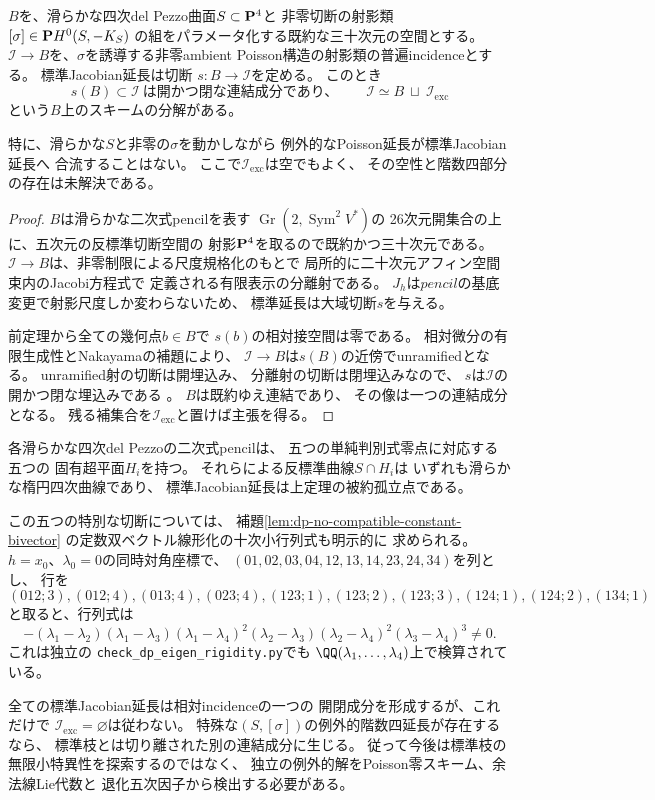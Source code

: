 \begin{theorem}[普遍incidenceにおける標準Jacobian枝の開閉分離]
\label{thm:dp-global-standard-branch-splitting}
$B$を、滑らかな四次del Pezzo曲面$S\subset\mathbf P^4$と
非零切断の射影類$[\sigma]\in\mathbf P H^0(S,-K_S)$
の組をパラメータ化する既約な三十次元の空間とする。
$\mathscr I\to B$を、$\sigma$を誘導する非零ambient
Poisson構造の射影類の普遍incidenceとする。
標準Jacobian延長は切断
$s:B\to\mathscr I$を定める。
このとき
\[
 \boxed{\quad
 s(B)\subset\mathscr I\ \text{は開かつ閉な連結成分であり、}
 \qquad
 \mathscr I\simeq B\ \sqcup\ \mathscr I_{\mathrm{exc}}
 \quad}
\]
という$B$上のスキームの分解がある。

特に、滑らかな$S$と非零の$\sigma$を動かしながら
例外的なPoisson延長が標準Jacobian延長へ
合流することはない。
ここで$\mathscr I_{\mathrm{exc}}$は空でもよく、
その空性と階数四部分の存在は未解決である。
\end{theorem}
\begin{proof}
$B$は滑らかな二次式pencilを表す
$\operatorname{Gr}(2,\operatorname{Sym}^2V^*)$の
26次元開集合の上に、五次元の反標準切断空間の
射影$\mathbf P^4$を取るので既約かつ三十次元である。
$\mathscr I\to B$は、非零制限による尺度規格化のもとで
局所的に二十次元アフィン空間束内のJacobi方程式で
定義される有限表示の分離射である。
$J_h$は$pencil$の基底変更で射影尺度しか変わらないため、
標準延長は大域切断$s$を与える。

前定理から全ての幾何点$b\in B$で
$s(b)$の相対接空間は零である。
相対微分の有限生成性とNakayamaの補題により、
$\mathscr I\to B$は$s(B)$の近傍でunramifiedとなる。
unramified射の切断は開埋込み、
分離射の切断は閉埋込みなので、
$s$は$\mathscr I$の開かつ閉な埋込みである
\cite[Proposition 41.6.1]{StacksUnramifiedSection}。
$B$は既約ゆえ連結であり、
その像は一つの連結成分となる。
残る補集合を$\mathscr I_{\mathrm{exc}}$と置けば主張を得る。
\end{proof}

\begin{corollary}[判別式の五つの固有超平面切断]
\label{cor:dp-eigen-hyperplane-rigidity}
各滑らかな四次del Pezzoの二次式pencilは、
五つの単純判別式零点に対応する五つの
固有超平面$H_i$を持つ。
それらによる反標準曲線$S\cap H_i$は
いずれも滑らかな楕円四次曲線であり、
標準Jacobian延長は上定理の被約孤立点である。

この五つの特別な切断については、
補題\ref{lem:dp-no-compatible-constant-bivector}
の定数双ベクトル線形化の十次小行列式も明示的に
求められる。$h=x_0$、$\lambda_0=0$の同時対角座標で、
$(01,02,03,04,12,13,14,23,24,34)$を列とし、
行を
\[
(012;3),(012;4),(013;4),(023;4),
(123;1),(123;2),(123;3),(124;1),(124;2),(134;1)
\]
と取ると、行列式は
\[
 -(\lambda_1-\lambda_2)(\lambda_1-\lambda_3)
 (\lambda_1-\lambda_4)^2(\lambda_2-\lambda_3)
 (\lambda_2-\lambda_4)^2(\lambda_3-\lambda_4)^3\ne0.
\]
これは独立の
\texttt{check\_dp\_eigen\_rigidity.py}でも
$\QQ(\lambda_1,\ldots,\lambda_4)$上で検算されている。
\end{corollary}

\begin{remark}[普遍剛性と混同しない]
全ての標準Jacobian延長は相対incidenceの一つの
開閉成分を形成するが、これだけで
$\mathscr I_{\mathrm{exc}}=\varnothing$は従わない。
特殊な$(S,[\sigma])$の例外的階数四延長が存在するなら、
標準枝とは切り離された別の連結成分に生じる。
従って今後は標準枝の無限小特異性を探索するのではなく、
独立の例外的解をPoisson零スキーム、余法線Lie代数と
退化五次因子から検出する必要がある。
\end{remark}
